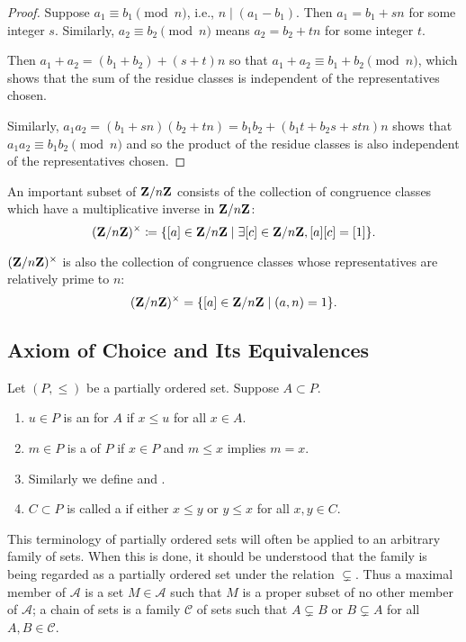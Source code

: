 \begin{example}
\begin{proof}
Suppose $a_1\equiv b_1\pmod n$, i.e., $n\mid(a_1-b_1)$. Then $a_1=b_1+sn$ for some integer $s$. Similarly, $a_2\equiv b_2\pmod n$ means $a_2=b_2+tn$ for some integer $t$.

Then $a_1+a_2=(b_1+b_2)+(s+t)n$ so that $a_1+a_2\equiv b_1+b_2\pmod n$, which shows that the sum of the residue classes is independent of the representatives chosen.

Similarly, $a_1a_2=(b_1+sn)(b_2+tn)=b_1b_2+(b_1t+b_2s+stn)n$ shows that $a_1a_2\equiv b_1b_2\pmod n$ and so the product of the residue classes is also independent of the representatives chosen.
\end{proof}

An important subset of $\mathbf Z/n\mathbf Z$ consists of the collection of congruence classes which have a multiplicative inverse in $\mathbf Z/n\mathbf Z$:
\[(\mathbf Z/n\mathbf Z)^\times\coloneqq\{[a]\in\mathbf Z/n\mathbf Z\mid\exists[c]\in\mathbf Z/n\mathbf Z,[a][c]=[1]\}.\]

\begin{proposition}
$(\mathbf Z/n\mathbf Z)^\times$ is also the collection of congruence classes whose representatives are relatively prime to $n$:
\[(\mathbf Z/n\mathbf Z)^\times=\{[a]\in\mathbf Z/n\mathbf Z\mid(a,n)=1\}.\]
\end{proposition}
\end{example}

\subsection{Axiom of Choice and Its Equivalences}
\begin{definition}
Let $(P,\le)$ be a partially ordered set. Suppose $A\subset P$.
\begin{enumerate}[label=(\roman*)]
\item $u\in P$ is an  for $A$ if $x\le u$ for all $x\in A$.
\item $m\in P$ is a  of $P$ if $x\in P$ and $m\le x$ implies $m=x$.
\item Similarly we define  and .
\item $C\subset P$ is called a  if either $x\le y$ or $y\le x$ for all $x,y\in C$.
\end{enumerate}
\end{definition}

This terminology of partially ordered sets will often be applied to an arbitrary family of sets. When this is done, it should be understood that the family is being regarded as a partially ordered set under the relation $\subsetneq$. Thus a maximal member of $\mathscr{A}$ is a set $M\in\mathscr{A}$ such that $M$ is a proper subset of no other member of $\mathscr{A}$; a chain of sets is a family $\mathscr{C}$ of sets such that $A\subsetneq B$ or $B\subsetneq A$ for all $A,B\in\mathscr{C}$.


